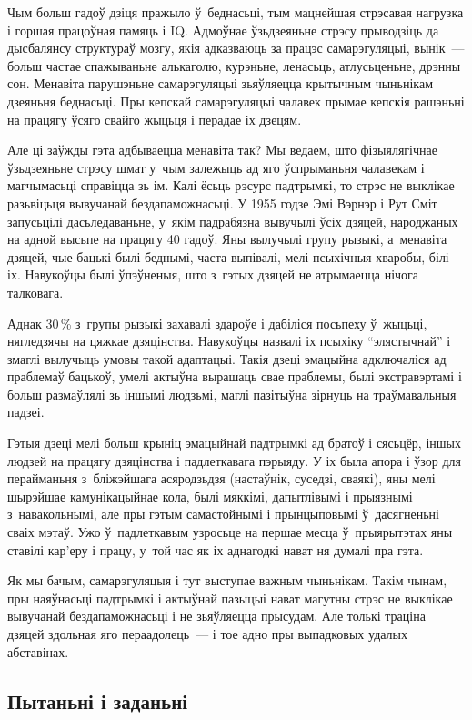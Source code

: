 Чым больш гадоў дзіця пражыло ў~беднасьці, тым мацнейшая стрэсавая нагрузка і горшая працоўная памяць і IQ. Адмоўнае ўзьдзеяньне стрэсу прыводзіць да дысбалянсу структураў мозгу, якія адказваюць за працэс самарэгуляцыі, вынік~--- больш частае спажываньне алькаголю, курэньне, ленасьць, атлусьценьне, дрэнны сон. Менавіта парушэньне самарэгуляцыі зьяўляецца крытычным чыньнікам дзеяньня беднасьці. Пры кепскай самарэгуляцыі чалавек прымае кепскія рашэньні на працягу ўсяго свайго жыцьця і перадае іх дзецям.

Але ці заўжды гэта адбываецца менавіта так? Мы ведаем, што фізыялягічнае ўзьдзеяньне стрэсу шмат у~чым залежыць ад яго ўспрыманьня чалавекам і магчымасьці справіцца зь ім. Калі ёсьць рэсурс падтрымкі, то стрэс не выклікае разьвіцьця вывучанай бездапаможнасьці. У 1955 годзе Эмі Вэрнэр і Рут Сміт запусьцілі дасьледаваньне, у~якім падрабязна вывучылі ўсіх дзяцей, народжаных на адной высьпе на працягу 40 гадоў. Яны вылучылі групу рызыкі, а~менавіта дзяцей, чые бацькі былі беднымі, часта выпівалі, мелі псыхічныя хваробы, білі іх. Навукоўцы былі ўпэўненыя, што з~гэтых дзяцей не атрымаецца нічога талковага.

Аднак 30\,\% з~групы рызыкі захавалі здароўе і дабіліся посьпеху ў~жыцьці, нягледзячы на цяжкае дзяцінства. Навукоўцы назвалі іх псыхіку ``элястычнай'' і змаглі вылучыць умовы такой адаптацыі. Такія дзеці эмацыйна адключаліся ад праблемаў бацькоў, умелі актыўна вырашаць свае праблемы, былі экстравэртамі і больш размаўлялі зь іншымі людзьмі, маглі пазітыўна зірнуць на траўмавальныя падзеі.

Гэтыя дзеці мелі больш крыніц эмацыйнай падтрымкі ад братоў і сясьцёр, іншых людзей на працягу дзяцінства і падлеткавага пэрыяду. У іх была апора і ўзор для перайманьня з~бліжэйшага асяродзьдзя (настаўнік, суседзі, сваякі), яны мелі шырэйшае камунікацыйнае кола, былі мяккімі, дапытлівымі і прыязнымі з~навакольнымі, але пры гэтым самастойнымі і прынцыповымі ў~дасягненьні сваіх мэтаў. Ужо ў~падлеткавым узросьце на першае месца ў~прыярытэтах яны ставілі кар'еру і працу, у~той час як іх аднагодкі нават ня думалі пра гэта.

Як мы бачым, самарэгуляцыя і тут выступае важным чыньнікам. Такім чынам, пры наяўнасьці падтрымкі і актыўнай пазыцыі нават магутны стрэс не выклікае вывучанай бездапаможнасьці і не зьяўляецца прысудам. Але толькі траціна дзяцей здольная яго пераадолець~--- і тое адно пры выпадковых удалых абставінах.

\subsection*{Пытаньні і заданьні}

